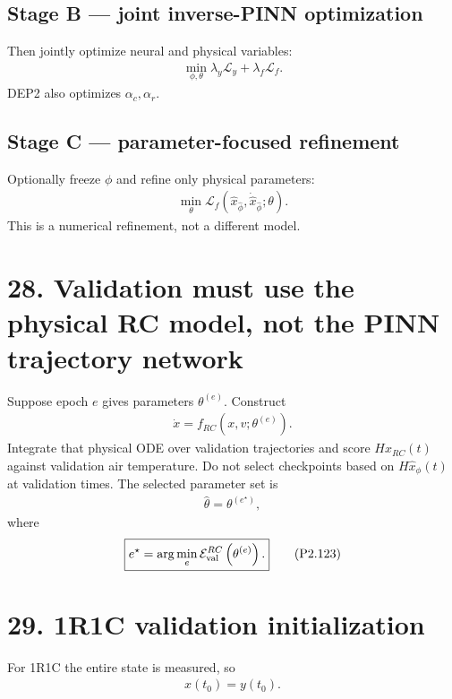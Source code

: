 \documentclass[11pt]{article}
\begin{document}
\subsection*{Stage B --- joint inverse-PINN optimization}
Then jointly optimize neural and physical variables:
\begin{align}
\boxed{\min_{\phi,\theta}\lambda_y\mathcal L_y+\lambda_f\mathcal L_f.}
\tag{P2.119}
\end{align}
DEP2 also optimizes \(\alpha_c,\alpha_r\).

\subsection*{Stage C --- parameter-focused refinement}
Optionally freeze \(\phi\) and refine only physical parameters:
\begin{align}
\boxed{\min_\theta\mathcal L_f\left(\widehat x_{\widehat\phi},\dot{\widehat x}_{\widehat\phi};\theta\right).}
\tag{P2.120}
\end{align}
This is a numerical refinement, not a different model.

\section*{28. Validation must use the physical RC model, not the PINN trajectory network}
Suppose epoch \(e\) gives parameters \(\theta^{(e)}\). Construct
\begin{align}
\boxed{\dot x=f_{RC}\left(x,v;\theta^{(e)}\right).}
\tag{P2.121}
\end{align}
Integrate that physical ODE over validation trajectories and score \(Hx_{RC}(t)\) against validation air temperature. Do not select checkpoints based on \(H\widehat x_\phi(t)\) at validation times. The selected parameter set is
\begin{align}
\boxed{\widehat\theta=\theta^{(e^\star)},}
\tag{P2.122}
\end{align}
where
\begin{align}
\boxed{e^\star=\arg\min_e\mathcal E_{\rm val}^{RC}\left(\theta^{(e)}\right).}
\tag{P2.123}
\end{align}

\section*{29. 1R1C validation initialization}
For 1R1C the entire state is measured, so
\begin{align}
\boxed{x(t_0)=y(t_0).}
\tag{P2.124}
\end{align}
\end{document}
